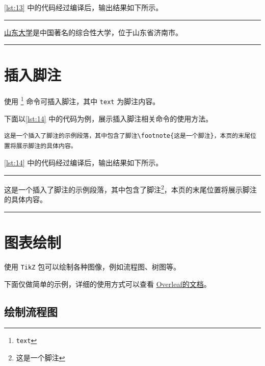 \documentclass[a4paper]{article}
\begin{document}
\cref{lst:13} 中的代码经过编译后，输出结果如下所示。

\vspace{0.75cm}
\hrule
\vspace{0.25cm}

\href{https://www.sdu.edu.cn/}{山东大学}是中国著名的综合性大学，位于山东省济南市。

\vspace{0.25cm}
\hrule
\vspace{0.25cm}

\section{插入脚注}

使用 \texttt{\footnote{text}} 命令可插入脚注，其中 \texttt{text} 为脚注内容。

下面以\cref{lst:14} 中的代码为例，展示插入脚注相关命令的使用方法。

\begin{center}
    \label{lst:14}
    \begin{verbatim}
这是一个插入了脚注的示例段落，其中包含了脚注\footnote{这是一个脚注}，本页的末尾位置将展示脚注的具体内容。
    \end{verbatim}
\end{center}

\cref{lst:14} 中的代码经过编译后，输出结果如下所示。

\vspace{0.75cm}
\hrule
\vspace{0.25cm}

这是一个插入了脚注的示例段落，其中包含了脚注\footnote{这是一个脚注}，本页的末尾位置将展示脚注的具体内容。

\vspace{0.25cm}
\hrule
\vspace{0.25cm}

\section{图表绘制}

使用 \texttt{TikZ} 包可以绘制各种图像，例如流程图、树图等。

下面仅做简单的示例，详细的使用方式可以查看 \href{https://cn.overleaf.com/learn/latex/TikZ_package}{Overleaf的文档}。

\subsection{绘制流程图}
\end{document}
